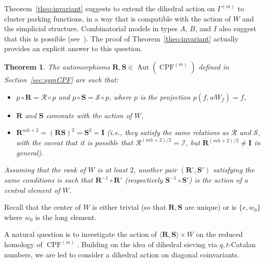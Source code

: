 \documentclass[11pt]{article}
\newtheorem{theo}{Theorem}[section]
\theoremstyle{definition}
\DeclareMathOperator{\Aut}{Aut}
\newcommand{\RR}{\mathcal{R}}
\renewcommand{\SS}{\mathcal{S}}
\newcommand{\II}{\mathcal{I}}
\newcommand{\RRR}{\mathbf{R}}
\newcommand{\SSS}{\mathbf{S}}
\newcommand{\III}{\mathbf{I}}
\DeclareMathOperator{\CPF}{CPF}
\begin{document}
Theorem~\ref{theo:invariant} suggests to extend the dihedral action on $\Gamma^{(m)}$ to cluster parking functions, in a way that is compatible with the action of $W$ and the simplicial structure.  Combinatorial models in types $A$, $B$, and $I$ also suggest that this is possible (see~\cite[Open problem~10.3]{douvropoulosjosuatverges2}).  The proof of Theorem~\ref{theo:invariant} actually provides an explicit answer to this question.

\begin{theo} \label{theo:extend}
     The automorphisms $\RRR,\SSS \in \Aut( \CPF^{(m)})$ defined in Section~\ref{sec:symCPF} are such that:
    \begin{itemize}
        \item $p \circ \RRR = \RR \circ p $ and $p \circ \SSS = \SS \circ p$, where $p$ is the projection $p(f,wW_{\underline{f}}) = f$,
        \item $\RRR$ and $\SSS$ commute with the action of $W$,
        \item $\RRR^{mh+2} = (\RRR\SSS)^2 = \SSS^2 = \III$ (i.e., they satisfy the same relations as $\RR$ and $\SS$, with the {\it caveat} that it is possible that $\RR^{(mh+2)/2} = \II$, but  $\RRR^{(mh+2)/2} \neq \III$ in general).
    \end{itemize}
    Assuming that the rank of $W$ is at least $2$, another pair $(\RRR',\SSS')$ satisfying the same conditions is such that $\RRR^{-1}\circ \RRR'$ (respectively $\SSS^{-1}\circ \SSS'$) is the action of a central element of $W$.
\end{theo}

Recall that the center of $W$ is either trivial (so that $\RRR,\SSS$ are unique) or is $\{e,w_0\}$ where $w_0$ is the long element.

A natural question is to investigate the action of $\langle \RRR,\SSS \rangle \times W$ on the reduced homology of $\CPF^{(m)}$.  Building on the idea of dihedral sieving via $q,t$-Catalan numbers, we are led to consider a dihedral action on diagonal coinvariants. 

\end{document}
